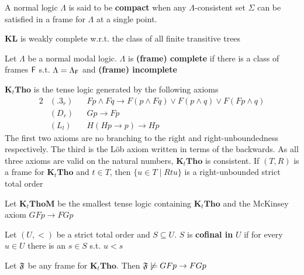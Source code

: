 \documentclass[11pt]{article}
\newcommand{\KL}{\textbf{KL}}
\newcommand{\KtTho}{\textbf{K}_t\textbf{Tho}}
\newcommand{\KtThoM}{\textbf{K}_t\textbf{ThoM}}
\begin{document}
\begin{remark}
A normal logic \(\Lambda\) is said to be \textbf{compact} when any \(\Lambda\)-consistent set \(\Sigma\)
can be satisfied in a frame for \(\Lambda\) at a single point.
\end{remark}

\begin{theorem}[]
\(\KL\) is weakly complete w.r.t. the class of all finite transitive trees
\end{theorem}

\begin{definition}[]
Let \(\Lambda\) be a normal modal logic. \(\Lambda\) is \textbf{(frame) complete} if there is a class of
frames \(\textsf{F}\) s.t. \(\Lambda=\Lambda_{\textsf{F}}\) and \textbf{(frame) incomplete}
\end{definition}

\(\KtTho\) is the tense logic generated by the following axioms
\begin{alignat*}{2}
&(.3_r)&&Fp\wedge Fq\to F(p\wedge Fq)\vee F(p\wedge q)\vee F(Fp\wedge q)\\
&(D_r)&&Gp\to Fp\\
&(L_l)&&H(Hp\to p)\to Hp
\end{alignat*}
The first two axioms are no branching to the right and right-unboundedness
respectively. The third is the Löb axiom written in terms of the backwards.
As all three axioms are valid on the natural numbers, \(\KtTho\) is
consistent. If \((T,R)\) is a frame for \(\KtTho\) and \(t\in T\), then
\(\{u\in T\mid Rtu\}\) is a right-unbounded strict total order

Let \(\KtThoM\) be the smallest tense logic containing \(\KtTho\) and the
McKinsey axiom \(GFp\to FGp\)

\begin{definition}[]
Let \((U,<)\) be a strict total order and \(S\subseteq U\). \(S\) is \textbf{cofinal
in} \(U\) if for every \(u\in U\) there is an \(s\in S\) s.t. \(u<s\)
\end{definition}

\begin{lemma}[]
Let \(\mathfrak{F}\) be any frame for \(\KtTho\). Then \(\mathfrak{F}\not\models GFp\to FGp\)
\end{lemma}
\end{document}
